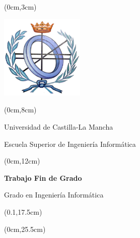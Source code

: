 %
% 
\pagestyle{empty}
\begin{titlepage}\null



\begin{textblock*}{\paperwidth}(0cm,3cm)
\begin{center}
\includegraphics[width=4cm]{figs/logoconciti.png}
\end{center}
\end{textblock*}


\begin{textblock*}{\paperwidth}(0cm,8cm) 
\begin{center}\doublespacing
{\fontsize{16pt}{2pt}\selectfont Universidad de Castilla-La Mancha}

{\fontsize{16pt}{2pt}\selectfont Escuela Superior de Ingeniería Informática}
\end{center}
\end{textblock*}


\begin{textblock*}{\paperwidth}(0cm,12cm) 
\begin{center}\doublespacing 
{\bf\fontsize{18pt}{4pt}\selectfont Trabajo Fin de Grado}

{\fontsize{18pt}{4pt}\selectfont Grado en Ingeniería Informática}

{\fontsize{16pt}{4pt}\selectfont \espec}
\end{center}
\end{textblock*}


\begin{textblock*}{0.8\paperwidth}(0.1\paperwidth,17.5cm) 
\begin{center}\doublespacing %
{\bf\fontsize{20pt}{4pt}\selectfont \titulo}

\vskip1cm
{\it \fontsize{18pt}{4pt}\selectfont \autor}
\end{center}
\end{textblock*}


\begin{textblock*}{\paperwidth}(0cm,25.5cm) 
\begin{center}
{\fontsize{14pt}{4pt}\selectfont \fecha}
\end{center}
\end{textblock*}
\end{titlepage}